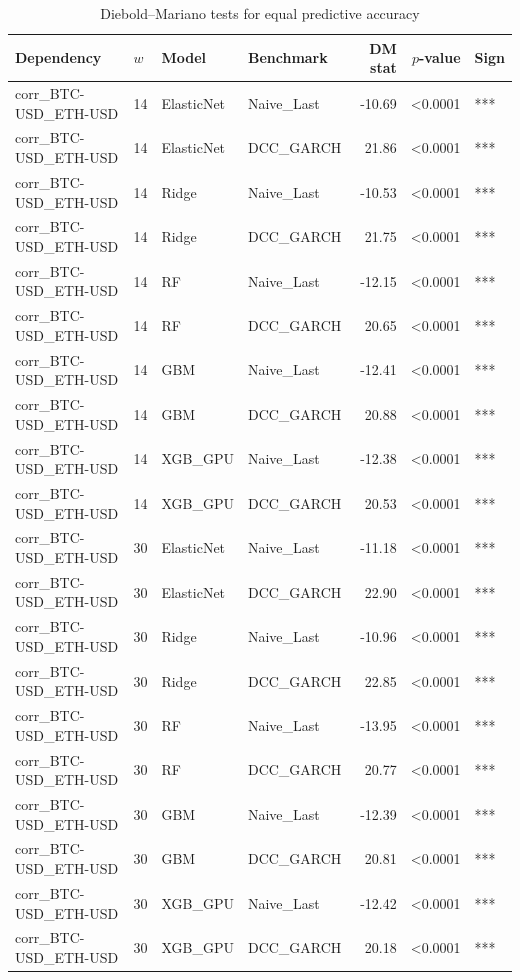 \begin{table}[H]
\centering
\small
\caption{Diebold--Mariano tests for equal predictive accuracy}
\label{tab:dm_tests}
\begin{tabular}{llllrrl}
\toprule
Dependency & $w$ & Model & Benchmark & DM stat & $p$-value & Sign \\
\midrule
corr_BTC-USD_ETH-USD & 14 & ElasticNet & Naive_Last & -10.69 & <0.0001 & *** \\
corr_BTC-USD_ETH-USD & 14 & ElasticNet & DCC_GARCH & 21.86 & <0.0001 & *** \\
corr_BTC-USD_ETH-USD & 14 & Ridge & Naive_Last & -10.53 & <0.0001 & *** \\
corr_BTC-USD_ETH-USD & 14 & Ridge & DCC_GARCH & 21.75 & <0.0001 & *** \\
corr_BTC-USD_ETH-USD & 14 & RF & Naive_Last & -12.15 & <0.0001 & *** \\
corr_BTC-USD_ETH-USD & 14 & RF & DCC_GARCH & 20.65 & <0.0001 & *** \\
corr_BTC-USD_ETH-USD & 14 & GBM & Naive_Last & -12.41 & <0.0001 & *** \\
corr_BTC-USD_ETH-USD & 14 & GBM & DCC_GARCH & 20.88 & <0.0001 & *** \\
corr_BTC-USD_ETH-USD & 14 & XGB_GPU & Naive_Last & -12.38 & <0.0001 & *** \\
corr_BTC-USD_ETH-USD & 14 & XGB_GPU & DCC_GARCH & 20.53 & <0.0001 & *** \\
corr_BTC-USD_ETH-USD & 30 & ElasticNet & Naive_Last & -11.18 & <0.0001 & *** \\
corr_BTC-USD_ETH-USD & 30 & ElasticNet & DCC_GARCH & 22.90 & <0.0001 & *** \\
corr_BTC-USD_ETH-USD & 30 & Ridge & Naive_Last & -10.96 & <0.0001 & *** \\
corr_BTC-USD_ETH-USD & 30 & Ridge & DCC_GARCH & 22.85 & <0.0001 & *** \\
corr_BTC-USD_ETH-USD & 30 & RF & Naive_Last & -13.95 & <0.0001 & *** \\
corr_BTC-USD_ETH-USD & 30 & RF & DCC_GARCH & 20.77 & <0.0001 & *** \\
corr_BTC-USD_ETH-USD & 30 & GBM & Naive_Last & -12.39 & <0.0001 & *** \\
corr_BTC-USD_ETH-USD & 30 & GBM & DCC_GARCH & 20.81 & <0.0001 & *** \\
corr_BTC-USD_ETH-USD & 30 & XGB_GPU & Naive_Last & -12.42 & <0.0001 & *** \\
corr_BTC-USD_ETH-USD & 30 & XGB_GPU & DCC_GARCH & 20.18 & <0.0001 & *** \\

\end{tabular}
\end{table}
